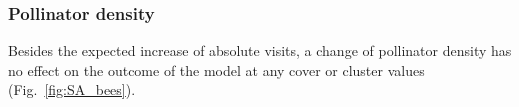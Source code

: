 \subsubsection*{Pollinator density}
Besides the expected increase of absolute visits, a change of pollinator density has no effect on the outcome of the model at any cover or cluster values (Fig.~\ref{fig:SA_bees}).

%
%
